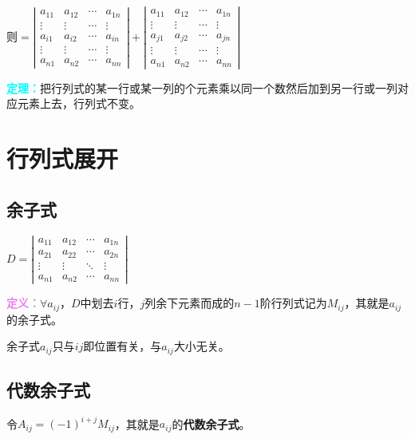 \documentclass[UTF8, 12pt]{ctexart}
\begin{document}
则$=\left|\begin{array}{cccc} 
    a_{11} & a_{12} & \cdots & a_{1n} \\
    \vdots & \vdots & \cdots & \vdots \\
    a_{i1} & a_{i2} & \cdots & a_{in}\\
    \vdots & \vdots & \cdots & \vdots \\
    a_{n1} & a_{n2} & \cdots & a_{nn}
\end{array}\right|+
\left|\begin{array}{cccc} 
    a_{11} & a_{12} & \cdots & a_{1n} \\
    \vdots & \vdots & \cdots & \vdots \\
    a_{j1} & a_{j2} & \cdots & a_{jn} \\
    \vdots & \vdots & \cdots & \vdots \\
    a_{n1} & a_{n2} & \cdots & a_{nn}
\end{array}\right|$

\textcolor{aqua}{\textbf{定理：}}把行列式的某一行或某一列的个元素乘以同一个数然后加到另一行或一列对应元素上去，行列式不变。

\section{行列式展开}

\subsection{余子式}

$
D=\left|\begin{array}{cccc} 
    a_{11} & a_{12} & \cdots & a_{1n} \\
    a_{21} & a_{22} & \cdots & a_{2n} \\
    \vdots & \vdots & \ddots & \vdots \\
    a_{n1} & a_{n2} & \cdots & a_{nn}
\end{array}\right|
$

\textcolor{violet}{\textbf{定义：}}$\forall a_{ij}$，$D$中划去$i$行，$j$列余下元素而成的$n-1$阶行列式记为$M_{ij}$，其就是$a_{ij}$的余子式。

余子式$a_{ij}$只与$ij$即位置有关，与$a_{ij}$大小无关。

\subsection{代数余子式}

令$A_{ij}=(-1)^{i+j}M_{ij}$，其就是$a_{ij}$的\textbf{代数余子式}。
\end{document}
